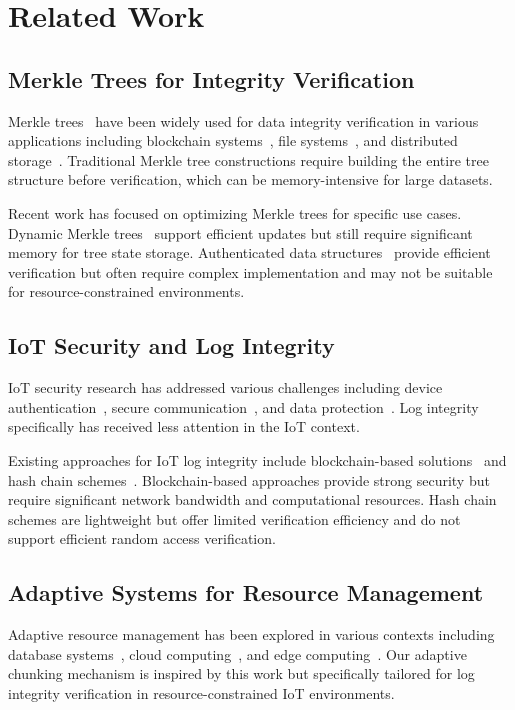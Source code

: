 \documentclass[a4paper,10pt]{article}
\begin{document}
\section{Related Work}
\label{sec:related}

\subsection{Merkle Trees for Integrity Verification}

Merkle trees~\cite{merkle1987} have been widely used for data integrity verification in various applications including blockchain systems~\cite{nakamoto2008}, file systems~\cite{wilcox2005}, and distributed storage~\cite{cachin2006}. Traditional Merkle tree constructions require building the entire tree structure before verification, which can be memory-intensive for large datasets.

Recent work has focused on optimizing Merkle trees for specific use cases. Dynamic Merkle trees~\cite{lund2020} support efficient updates but still require significant memory for tree state storage. Authenticated data structures~\cite{micali1999} provide efficient verification but often require complex implementation and may not be suitable for resource-constrained environments.

\subsection{IoT Security and Log Integrity}

IoT security research has addressed various challenges including device authentication~\cite{roman2018}, secure communication~\cite{mahmoud2015}, and data protection~\cite{zhang2020}. Log integrity specifically has received less attention in the IoT context.

Existing approaches for IoT log integrity include blockchain-based solutions~\cite{christidis2018} and hash chain schemes~\cite{yavuz2012}. Blockchain-based approaches provide strong security but require significant network bandwidth and computational resources. Hash chain schemes are lightweight but offer limited verification efficiency and do not support efficient random access verification.

\subsection{Adaptive Systems for Resource Management}

Adaptive resource management has been explored in various contexts including database systems~\cite{stonebraker2005}, cloud computing~\cite{armbrust2010}, and edge computing~\cite{satyanarayanan2017}. Our adaptive chunking mechanism is inspired by this work but specifically tailored for log integrity verification in resource-constrained IoT environments.
\end{document}

